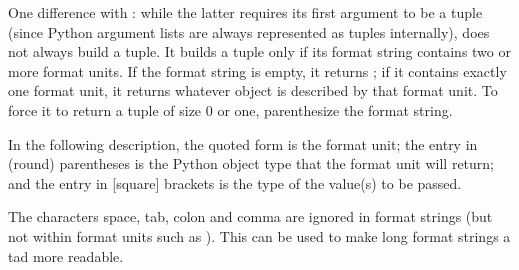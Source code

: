 \documentclass[twoside,openright]{report}
\begin{document}
One difference with : while the latter
requires its first argument to be a tuple (since Python argument lists
are always represented as tuples internally),  does
not always build a tuple.  It builds a tuple only if its format string
contains two or more format units.  If the format string is empty, it
returns ; if it contains exactly one format unit, it
returns whatever object is described by that format unit.  To force it
to return a tuple of size 0 or one, parenthesize the format string.

In the following description, the quoted form is the format unit; the
entry in (round) parentheses is the Python object type that the format
unit will return; and the entry in [square] brackets is the type of
the \C{} value(s) to be passed.

The characters space, tab, colon and comma are ignored in format
strings (but not within format units such as ).  This can be
used to make long format strings a tad more readable.
\end{document}
